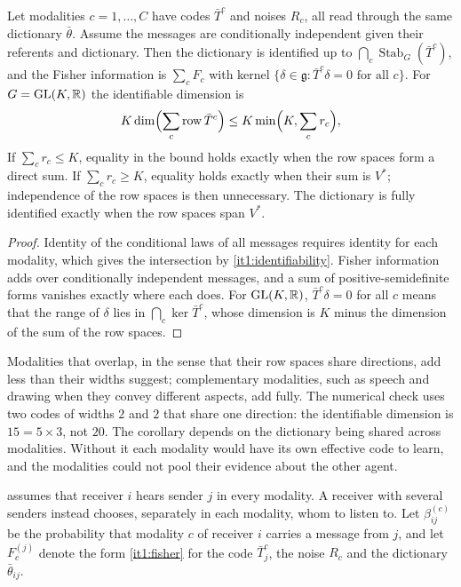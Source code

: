 \documentclass[11pt,letterpaper]{report}
\newcommand{\Stab}{\operatorname{Stab}}
\begin{document}
Let modalities $c=1,\ldots,C$ have codes $\bar T^c$ and noises $R_c$, all read through the same dictionary $\bar\theta$. Assume the messages are conditionally independent given their referents and dictionary. Then the dictionary is identified up to $\bigcap_c\Stab_G(\bar T^c)$, and the Fisher information is $\sum_cF_c$ with kernel $\{\delta\in\mathfrak g:\bar T^c\delta=0\text{ for all }c\}$. For $G=\mathrm{GL}(K,\mathbb R)$ the identifiable dimension is
\begin{equation}
K\dim\Bigl(\sum_c\operatorname{row}\bar T^c\Bigr)\leq K\min\Bigl(K,\sum_cr_c\Bigr),
\label{it1:modalities-eq}
\end{equation}
If $\sum_c r_c\leq K$, equality in the bound holds exactly when the row spaces form a direct sum. If $\sum_c r_c\geq K$, equality holds exactly when their sum is $V^*$; independence of the row spaces is then unnecessary. The dictionary is fully identified exactly when the row spaces span $V^*$.
\begin{proof}
Identity of the conditional laws of all messages requires identity for each modality, which gives the intersection by \cref{it1:identifiability}. Fisher information adds over conditionally independent messages, and a sum of positive-semidefinite forms vanishes exactly where each does. For $\mathrm{GL}(K,\mathbb R)$, $\bar T^c\delta=0$ for all $c$ means that the range of $\delta$ lies in $\bigcap_c\ker\bar T^c$, whose dimension is $K$ minus the dimension of the sum of the row spaces.
\end{proof}

Modalities that overlap, in the sense that their row spaces share directions, add less than their widths suggest; complementary modalities, such as speech and drawing when they convey different aspects, add fully. The numerical check uses two codes of widths $2$ and $2$ that share one direction: the identifiable dimension is $15=5\times3$, not $20$. The corollary depends on the dictionary being shared across modalities. Without it each modality would have its own effective code to learn, and the modalities could not pool their evidence about the other agent.

 assumes that receiver $i$ hears sender $j$ in every modality. A receiver with several senders instead chooses, separately in each modality, whom to listen to. Let $\beta^{(c)}_{ij}$ be the probability that modality $c$ of receiver $i$ carries a message from $j$, and let $F_c^{(j)}$ denote the form \cref{it1:fisher} for the code $\bar T_j^c$, the noise $R_c$ and the dictionary $\bar\theta_{ij}$.
\end{document}

